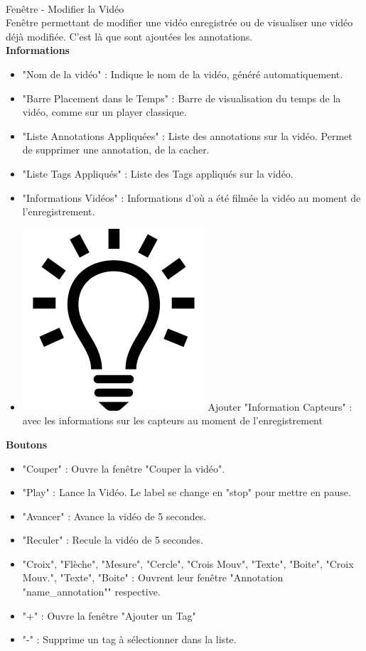 \documentclass[11pt,french,a4paper]{report}
\begin{document}
\dotfill \\

\Large Fenêtre - Modifier la Vidéo\normalsize \\
    Fenêtre permettant de modifier une vidéo enregistrée ou de visualiser une vidéo déjà modifiée.
    C'est là que sont ajoutées les annotations. \\
\large \textbf{Informations}\normalsize
     \begin{itemize}[label=, leftmargin=*,parsep=0cm,itemsep=0cm,topsep=0cm]
        \item "Nom de la vidéo" : Indique le nom de la vidéo, généré automatiquement.
        \item "Barre Placement dans le Temps" : Barre de visualisation du temps de la vidéo, comme sur un player classique.
        \item "Liste Annotations Appliquées" : Liste des annotations sur la vidéo. Permet de supprimer une annotation, de
        la cacher.
        \item "Liste Tags Appliqués" : Liste des Tags appliqués sur la vidéo.
        \item "Informations Vidéos" : Informations d'où a été filmée la vidéo au moment de l'enregistrement.
        \item \includegraphics[scale=0.05]{../images/logo/logo_ampoule} Ajouter "Information Capteurs" :
            avec les informations sur les capteurs au moment de l'enregistrement 
    \end{itemize}    
\large \textbf{Boutons}\normalsize
     \begin{itemize}[label=, leftmargin=*,parsep=0cm,itemsep=0cm,topsep=0cm]
        \item "Couper" : Ouvre la fenêtre "Couper la vidéo".
        \item "Play" : Lance la Vidéo. Le label se change en "stop" pour mettre en pause.
        \item "Avancer" : Avance la vidéo de 5 secondes.
        \item "Reculer" : Recule la vidéo de 5 secondes.
        \item "Croix", "Flèche", "Mesure", "Cercle", "Crois Mouv", "Texte", "Boite", "Croix Mouv.", "Texte", "Boite" : Ouvrent
        leur fenêtre "Annotation "name\_annotation"" respective.
        \item "+" : Ouvre la fenêtre "Ajouter un Tag"
        \item "-" : Supprime un tag à sélectionner dans la liste.
    \end{itemize}
\end{document}
